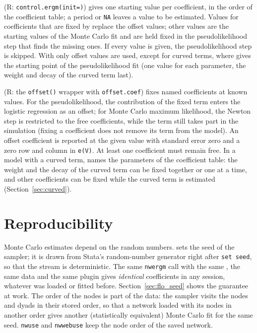 (R: \texttt{control.ergm(init=)}) gives one starting value per coefficient, in the order of the coefficient table; a period or \texttt{NA} leaves a value to be estimated. Values for coefficients that are fixed by  replace the offset values; other values are the starting values of the Monte Carlo fit and are held fixed in the pseudolikelihood step that finds the missing ones. If every value is given, the pseudolikelihood step is skipped. With  only offset values are used, except for curved terms, where  gives the starting point of the pseudolikelihood fit (one value for each parameter, the weight and decay of the curved term last).

 (R: the \texttt{offset()} wrapper with \texttt{offset.coef}) fixes named coefficients at known values. For the pseudolikelihood, the contribution of the fixed term enters the logistic regression as an offset; for Monte Carlo maximum likelihood, the Newton step is restricted to the free coefficients, while the term still takes part in the simulation (fixing a coefficient does not remove its term from the model). An offset coefficient is reported at the given value with standard error zero and a zero row and column in \texttt{e(V)}. At least one coefficient must remain free. In a model with a curved term,  names the parameters of the coefficient table: the weight and the decay of the curved term can be fixed together or one at a time, and other coefficients can be fixed while the curved term is estimated (Section~\ref{sec:curved}).

\section{Reproducibility}\label{sec:seed}

Monte Carlo estimates depend on the random numbers.  sets the seed of the sampler; it is drawn from Stata's random-number generator right after \texttt{set seed}, so that the stream is deterministic. The same \texttt{nwergm} call with the same , the same data and the same plugin gives \emph{identical} coefficients in any session, whatever was loaded or fitted before. Section~\ref{sec:flo_seed} shows the guarantee at work. The order of the nodes is part of the data: the sampler visits the nodes and dyads in their stored order, so that a network loaded with its nodes in another order gives another (statistically equivalent) Monte Carlo fit for the same seed. \texttt{nwuse} and \texttt{nwwebuse} keep the node order of the saved network.

